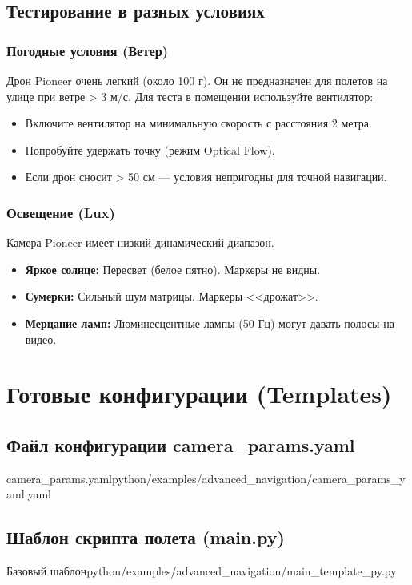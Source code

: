 \subsection{Тестирование в разных условиях}

\subsubsection{Погодные условия (Ветер)}
Дрон Pioneer очень легкий (около 100 г). Он не предназначен для полетов на улице при ветре > 3 м/с.
Для теста в помещении используйте вентилятор:
\begin{itemize}
    \item Включите вентилятор на минимальную скорость с расстояния 2 метра.
    \item Попробуйте удержать точку (режим Optical Flow).
    \item Если дрон сносит > 50 см — условия непригодны для точной навигации.
\end{itemize}

\subsubsection{Освещение (Lux)}
Камера Pioneer имеет низкий динамический диапазон.
\begin{itemize}
    \item \textbf{Яркое солнце:} Пересвет (белое пятно). Маркеры не видны.
    \item \textbf{Сумерки:} Сильный шум матрицы. Маркеры <<дрожат>>.
    \item \textbf{Мерцание ламп:} Люминесцентные лампы (50 Гц) могут давать полосы на видео.
\end{itemize}

\section{Готовые конфигурации (Templates)}

\subsection{Файл конфигурации camera\_params.yaml}
\begin{codefiletitle}[bash]{camera_params.yaml}{python/examples/advanced_navigation/camera_params_yaml.yaml}
\end{codefiletitle}

\subsection{Шаблон скрипта полета (main.py)}
\begin{codefiletitle}[python]{Базовый шаблон}{python/examples/advanced_navigation/main_template_py.py}
\end{codefiletitle}
